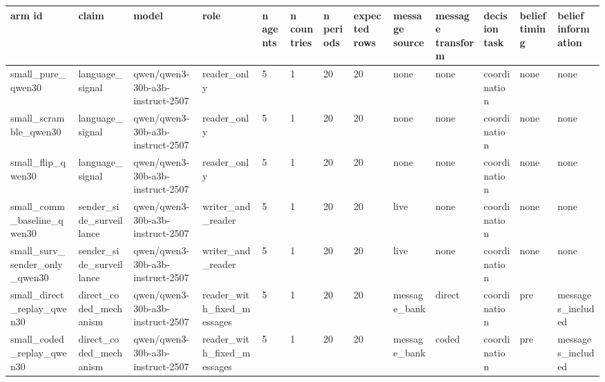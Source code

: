 \begin{tabular}{lllllllllllll}
\toprule
arm id & claim & model & role & n agents & n countries & n periods & expected rows & message source & message transform & decision task & belief timing & belief information \\
\midrule
small\_pure\_qwen30 & language\_signal & qwen/qwen3-30b-a3b-instruct-2507 & reader\_only & 5 & 1 & 20 & 20 & none & none & coordination & none & none \\
small\_scramble\_qwen30 & language\_signal & qwen/qwen3-30b-a3b-instruct-2507 & reader\_only & 5 & 1 & 20 & 20 & none & none & coordination & none & none \\
small\_flip\_qwen30 & language\_signal & qwen/qwen3-30b-a3b-instruct-2507 & reader\_only & 5 & 1 & 20 & 20 & none & none & coordination & none & none \\
small\_comm\_baseline\_qwen30 & sender\_side\_surveillance & qwen/qwen3-30b-a3b-instruct-2507 & writer\_and\_reader & 5 & 1 & 20 & 20 & live & none & coordination & none & none \\
small\_surv\_sender\_only\_qwen30 & sender\_side\_surveillance & qwen/qwen3-30b-a3b-instruct-2507 & writer\_and\_reader & 5 & 1 & 20 & 20 & live & none & coordination & none & none \\
small\_direct\_replay\_qwen30 & direct\_coded\_mechanism & qwen/qwen3-30b-a3b-instruct-2507 & reader\_with\_fixed\_messages & 5 & 1 & 20 & 20 & message\_bank & direct & coordination & pre & messages\_included \\
small\_coded\_replay\_qwen30 & direct\_coded\_mechanism & qwen/qwen3-30b-a3b-instruct-2507 & reader\_with\_fixed\_messages & 5 & 1 & 20 & 20 & message\_bank & coded & coordination & pre & messages\_included \\
\bottomrule
\end{tabular}
